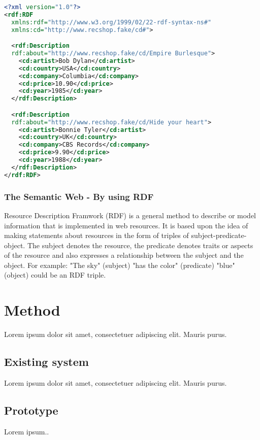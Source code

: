 \documentclass[a4paper,11pt]{kth-mag}
\begin{document}
\begin{lstlisting}[language=xml, caption=An RDF example describing two records, label=rdfexample]
<?xml version="1.0"?>
<rdf:RDF 
  xmlns:rdf="http://www.w3.org/1999/02/22-rdf-syntax-ns#"
  xmlns:cd="http://www.recshop.fake/cd#">

  <rdf:Description
  rdf:about="http://www.recshop.fake/cd/Empire Burlesque">
    <cd:artist>Bob Dylan</cd:artist>
    <cd:country>USA</cd:country>
    <cd:company>Columbia</cd:company>
    <cd:price>10.90</cd:price>
    <cd:year>1985</cd:year>
  </rdf:Description>

  <rdf:Description
  rdf:about="http://www.recshop.fake/cd/Hide your heart">
    <cd:artist>Bonnie Tyler</cd:artist>
    <cd:country>UK</cd:country>
    <cd:company>CBS Records</cd:company>
    <cd:price>9.90</cd:price>
    <cd:year>1988</cd:year>
  </rdf:Description>
</rdf:RDF>
\end{lstlisting}

\subsection{The Semantic Web - By using RDF} Resource Description Framwork
(RDF) is a general method to describe or model information that is implemented
in web resources. It is based upon the idea of making statements about
resources in the form of triples of subject-predicate-object. The subject
denotes the resource, the predicate denotes traits or aspects of the resource
and also expresses a relationship between the subject and the object. For
example: "The sky" (subject) "has the color" (predicate) "blue" (object) could
be an RDF triple.

\chapter{Method}

Lorem ipsum dolor sit amet, consectetuer adipiscing elit. Mauris
purus. 

\section{Existing system}

Lorem ipsum dolor sit amet, consectetuer adipiscing elit. Mauris
purus. 

\section{Prototype}
Lorem ipsum..
\end{document}
